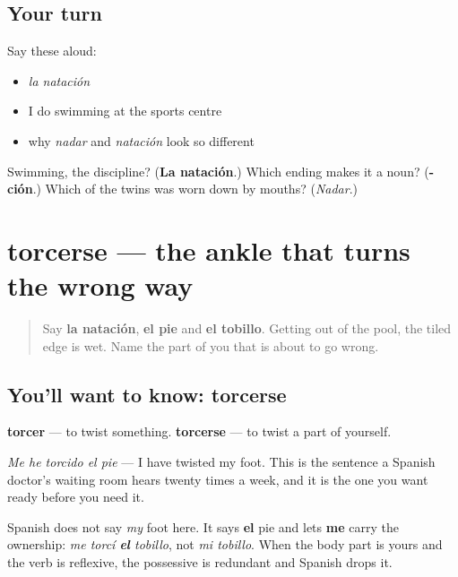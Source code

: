 \subsection*{Your turn}
Say these aloud:

\begin{itemize}
\raggedright
  \item \emph{la natación}
  \item I do swimming at the sports centre
  \item why \emph{nadar} and \emph{natación} look so different
\end{itemize}

\begin{tcolorbox}[breakable,colback=teal!4,colframe=teal!35!black,title={Before you move on}]
Swimming, the discipline? (\textbf{La natación}.) Which ending makes it a noun? (\textbf{-ción}.) Which of the twins was worn down by mouths? (\emph{Nadar}.)
\end{tcolorbox}
\section[torcerse]{torcerse — the ankle that turns the wrong way}

\label{lesson:ES-C438-torcerse}



\begin{quote}
Say \textbf{la natación}, \textbf{el pie} and \textbf{el tobillo}. Getting out of the pool, the tiled edge is wet. Name the part of you that is about to go wrong.
\end{quote}

\subsection*{You'll want to know: torcerse}
\textbf{torcer} — to twist something. \textbf{torcerse} — to twist a part of yourself.

\emph{Me he torcido el pie} — I have twisted my foot. This is the sentence a Spanish doctor's waiting room hears twenty times a week, and it is the one you want ready before you need it.

Spanish does not say \emph{my} foot here. It says \textbf{el} pie and lets \textbf{me} carry the ownership: \emph{me torcí \textbf{el} tobillo}, not \emph{mi tobillo}. When the body part is yours and the verb is reflexive, the possessive is redundant and Spanish drops it.

